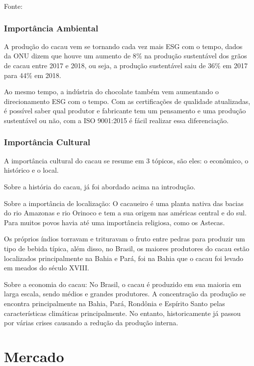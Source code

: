 \documentclass[
	12pt,				%
	openright,			%
	oneside,			%
	a4paper,			%
	english,			%
	french,				%
	spanish,			%
	brazil				%
	]{abntex2}
\begin{document}
\begin{center}
\footnotesize{Fonte: \cite{fatsecret}}
\end{center} 

\subsection{Importância Ambiental}

A produção do cacau vem se tornando cada vez mais ESG com o tempo, dados da ONU dizem que houve um aumento de 8$\%$ na produção sustentável dos grãos de cacau entre 2017 e 2018, ou seja, a produção sustentável saiu de  36$\%$ em 2017 para 44$\%$ em 2018. \cite{xpeed}

Ao mesmo tempo, a indústria do chocolate também vem aumentando o direcionamento ESG com o tempo. Com as certificações de qualidade atualizadas, é possível saber qual produtor e fabricante tem um pensamento e uma produção sustentável ou não, com a ISO 9001:2015 é fácil realizar essa diferenciação. \cite{dengo}

\subsection{Importância Cultural}

A importância cultural do cacau se resume em 3 tópicos, são eles: o econômico, o histórico e o local.

Sobre a história do cacau, já foi abordado acima na introdução.

Sobre a importância de localização: O cacaueiro é uma planta nativa das bacias do rio Amazonas e rio Orinoco e tem a sua origem nas américas central e do sul. Para muitos povos havia até uma importância religiosa, como os Astecas. \cite{1}

Os próprios índios torravam e trituravam o fruto entre pedras para produzir um tipo de bebida típica, além disso, no Brasil, os maiores produtores do cacau estão localizados principalmente na Bahia e Pará, foi na Bahia que o cacau foi levado em meados do século XVIII. \cite{7}

Sobre a economia do cacau: No Brasil, o cacau é produzido em sua maioria em larga escala, sendo médios e grandes produtores. A concentração da produção se encontra principalmente na Bahia, Pará, Rondônia e Espírito Santo pelas características climáticas principalmente. No entanto, historicamente já passou por várias crises causando a redução da produção interna. \cite{8}

\newpage
\chapter{Mercado}
\end{document}
